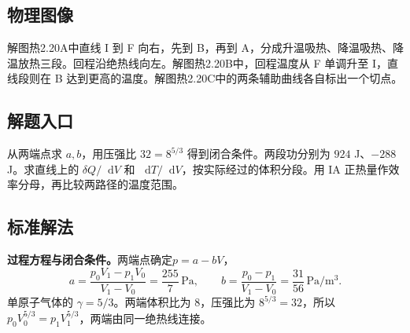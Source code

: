 \documentclass[UTF8,fontset=fandol,a4paper,11pt]{ctexart}
\newcommand{\dd}{\mathop{}\!\mathrm{d}}
\begin{document}


\subsection*{物理图像}

解图热2.20A中直线 I 到 F 向右，先到 B，再到 A，分成升温吸热、降温吸热、降温放热三段。回程沿绝热线向左。解图热2.20B中，回程温度从 F 单调升至 I，直线段则在 B 达到更高的温度。解图热2.20C中的两条辅助曲线各自标出一个切点。



\subsection*{解题入口}

从两端点求 $a,b$，用压强比 $32=8^{5/3}$ 得到闭合条件。两段功分别为 $924$ J、$-288$ J。求直线上的 $\delta Q/\dd V$ 和 $\dd T/\dd V$，按实际经过的体积分段。用 IA 正热量作效率分母，再比较两路径的温度范围。




\subsection*{标准解法}

\textbf{过程方程与闭合条件。}两端点确定$p=a-bV$，
\[a=\frac{p_0V_1-p_1V_0}{V_1-V_0}=\frac{255}{7}\,\mathrm{Pa},\qquad
b=\frac{p_0-p_1}{V_1-V_0}=\frac{31}{56}\,\mathrm{Pa/m^3}.\]
单原子气体的 $\gamma=5/3$。两端体积比为 8，压强比为 $8^{5/3}=32$，所以 $p_0V_0^{5/3}=p_1V_1^{5/3}$，两端由同一绝热线连接。
\end{document}
